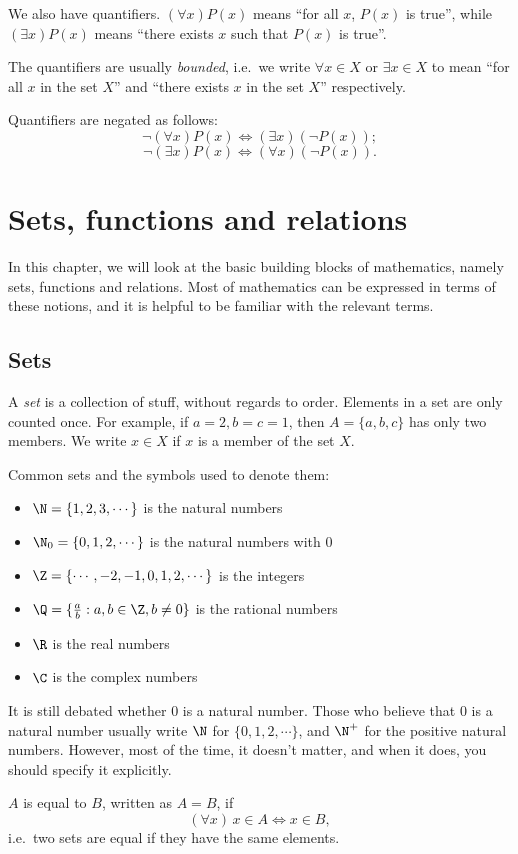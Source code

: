 \documentclass[a4paper]{article}
\begin{document}
We also have quantifiers. $(\forall x) P(x)$ means ``for all $x$, $P(x)$ is true'', while $(\exists x) P(x)$ means ``there exists $x$ such that $P(x)$ is true''.

The quantifiers are usually \emph{bounded}, i.e.\ we write $\forall x\in X$ or $\exists x\in X$ to mean ``for all $x$ in the set $X$'' and ``there exists $x$ in the set $X$'' respectively.

Quantifiers are negated as follows:
\[
  \neg (\forall x) P(x) \Leftrightarrow (\exists x)(\neg P(x));
\]
\[
  \neg (\exists x) P(x) \Leftrightarrow (\forall x)(\neg P(x)).
\]
\section{Sets, functions and relations}
In this chapter, we will look at the basic building blocks of mathematics, namely sets, functions and relations. Most of mathematics can be expressed in terms of these notions, and it is helpful to be familiar with the relevant terms.
\subsection{Sets}
\begin{defi}[Set]
  A \emph{set} is a collection of stuff, without regards to order. Elements in a set are only counted once. For example, if $a = 2, b = c = 1$, then $A = \{a, b, c\}$ has only two members. We write $x\in X$ if $x$ is a member of the set $X$.
\end{defi}

\begin{eg}
  Common sets and the symbols used to denote them:
  \begin{itemize}
    \item $\N = \{1, 2, 3, \cdots \}$ is the natural numbers
    \item $\N_0 = \{0, 1, 2, \cdots \}$ is the natural numbers with $0$
    \item $\Z = \{\cdots, -2, -1, 0, 1, 2, \cdots \}$ is the integers
    \item $\Q = \{\frac{a}{b}: a, b\in \Z, b \not= 0\}$ is the rational numbers
    \item $\R$ is the real numbers
    \item $\C$ is the complex numbers
  \end{itemize}
  It is still debated whether $0$ is a natural number. Those who believe that $0$ is a natural number usually write $\N$ for $\{0, 1, 2, \cdots\}$, and $\N^+$ for the positive natural numbers. However, most of the time, it doesn't matter, and when it does, you should specify it explicitly.
\end{eg}
\begin{defi}
  $A$ is equal to $B$, written as $A = B$, if
  \[
    (\forall x)\,x\in A \Leftrightarrow x\in B,
  \]
  i.e.\ two sets are equal if they have the same elements.
\end{defi}
\end{document}
